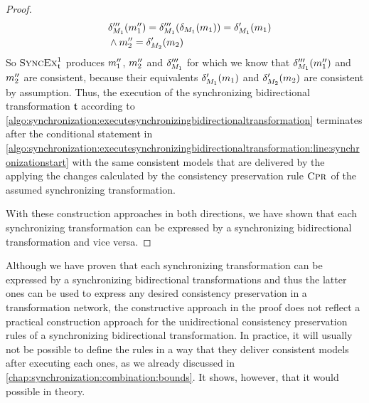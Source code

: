 \begin{proof}
\begin{align*}
        & \formulaskip
        \change{\metamodel{M}{1}}'''(\model{m}{1}'') = %
        \change{\metamodel{M}{1}}'''(\change{\metamodel{M}{1}}(\model{m}{1})) = %
        \change{\metamodel{M}{1}}'(\model{m}{1}) \\
        & \formulaskip
        \land
        \model{m}{2}'' = \change{\metamodel{M}{2}}'(\model{m}{2})
    \end{align*}
    So $\textsc{SyncEx}_{\mathfrak{t}}^1$ produces $m_{1}''$, $m_{2}''$ and $\delta_{M_{1}}'''$ for which we know that $\delta_{M_{1}}'''(m_{1}'')$ and $m_{2}''$ are consistent, because their equivalents $\delta_{M_{1}}'(m_{1})$ and $\delta_{M_{2}}'(m_{2})$ are consistent by assumption.
    Thus, the execution of the synchronizing bidirectional transformation $\mathfrak{t}$ according to \autoref{algo:synchronization:executesynchronizingbidirectionaltransformation} terminates after the conditional statement in \autoref{algo:synchronization:executesynchronizingbidirectionaltransformation:line:synchronizationstart} with the same consistent models that are delivered by the applying the changes calculated by the consistency preservation rule $\textsc{Cpr}_{}$ of the assumed synchronizing transformation.

    With these construction approaches in both directions, we have shown that each synchronizing transformation can be expressed by a synchronizing bidirectional transformation and vice versa.
\end{proof}

Although we have proven that each synchronizing transformation can be expressed by a synchronizing bidirectional transformations and thus the latter ones can be used to express any desired consistency preservation in a transformation network, the constructive approach in the proof does not reflect a practical construction approach for the unidirectional consistency preservation rules of a synchronizing bidirectional transformation.
In practice, it will usually not be possible to define the rules in a way that they deliver consistent models after executing each ones, as we already discussed in \autoref{chap:synchronization:combination:bounds}.
It shows, however, that it would possible in theory.

